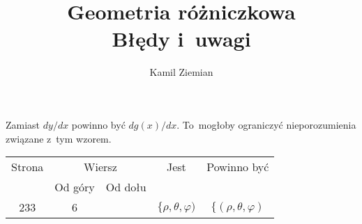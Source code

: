 \documentclass[a4paper,11pt]{article}
\title{Geometria różniczkowa \\
  {\Large Błędy i~uwagi}}
\author{Kamil Ziemian}
\begin{document}





\maketitle %






\vspace{0em}



\vspace{0em}


 Zamiast $dy/dx$ powinno być $d g( x )/dx$.
To~mogłoby ograniczyć nieporozumienia związane z~tym wzorem.

\vspace{\spaceFour}







\begin{center}

  \begin{tabular}{|c|c|c|c|c|}
    \hline
    Strona & \multicolumn{2}{c|}{Wiersz} & Jest
                              & Powinno być \\ \cline{2-3}
    & Od góry & Od dołu & & \\
    \hline
    233 &  6 & & $\{ \rho, \theta, \varphi )$ & $\{ ( \rho, \theta, \varphi )$ \\
    \hline
  \end{tabular}

\end{center}
\end{document}
